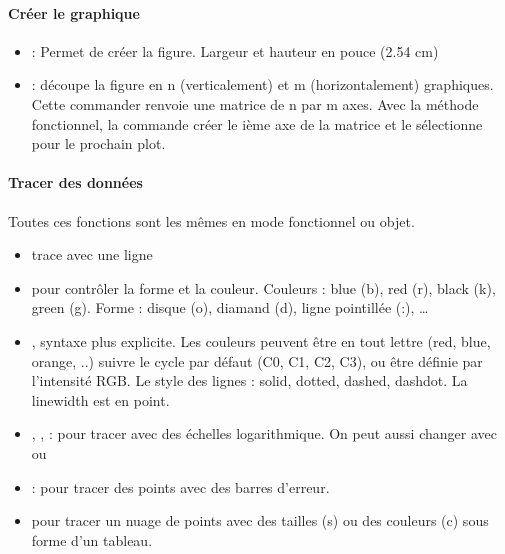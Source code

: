 \documentclass[letterpaper,10pt,english]{sphinxhowto}
\begin{document}
\paragraph{Créer le graphique}
\label{\detokenize{cours7_graphiques_cours:creer-le-graphique}}\begin{itemize}
\item {} 
\sphinxAtStartPar
{} : Permet de créer la figure. Largeur et hauteur en pouce (2.54 cm)

\item {} 
\sphinxAtStartPar
{} : découpe la figure en n (verticalement) et m (horizontalement) graphiques. Cette commander renvoie une matrice de n par m axes. Avec la méthode fonctionnel, la commande  créer le ième axe de la matrice et le sélectionne pour le prochain plot.

\end{itemize}


\paragraph{Tracer des données}
\label{\detokenize{cours7_graphiques_cours:tracer-des-donnees}}
\sphinxAtStartPar
Toutes ces fonctions sont les mêmes en mode fonctionnel ou objet.
\begin{itemize}
\item {} 
\sphinxAtStartPar
{} trace avec une ligne

\item {} 
\sphinxAtStartPar
{} pour contrôler la forme et la couleur. Couleurs : blue (b), red (r), black (k), green (g). Forme : disque (o), diamand (d), ligne pointillée (:), …

\item {} 
\sphinxAtStartPar
{}, syntaxe plus explicite. Les couleurs peuvent être en tout lettre (red, blue, orange, ..) suivre le cycle par défaut (C0, C1, C2, C3), ou être définie par l’intensité RGB. Le style des lignes : solid, dotted, dashed, dashdot. La linewidth est en point.

\item {} 
\sphinxAtStartPar
{}, ,  : pour tracer avec des échelles logarithmique. On peut aussi changer avec  ou 

\item {} 
\sphinxAtStartPar
{}: pour tracer des points avec des barres d’erreur.

\item {} 
\sphinxAtStartPar
{} pour tracer un nuage de points avec des tailles (s) ou des couleurs (c) sous forme d’un tableau.

\end{itemize}
\end{document}
